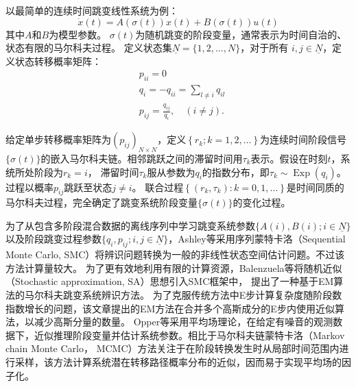 以最简单的连续时间跳变线性系统\cite{fang2002stabilization}为例：
\begin{equation}
    \dot{x}(t)=A(\sigma(t)) x(t)+B(\sigma(t)) u(t)
\end{equation}
其中$A$和$B$为模型参数。
$\sigma(t)$为随机跳变的阶段变量，通常表示为时间自治的、状态有限的马尔科夫过程。
定义状态集$\underline{N}=\{1,2, \ldots, N\}$，对于所有 $i, j \in \underline{N}$，定义状态转移概率矩阵：
\begin{equation}
    \begin{aligned}
    &p_{i i}=0\\
    &q_i=-q_{i i}=\sum_{l \neq i} q_{i l}\\
    &p_{i j}=\frac{q_{i j}}{q_i}, \quad(i \neq j) .
    \end{aligned}
\end{equation}

给定单步转移概率矩阵为$\left(p_{i j}\right)_{N \times N}$，定义$\left\{r_k ; k=1,2, \ldots\right\}$为连续时间阶段信号$\{\sigma(t)\}$的嵌入马尔科夫链。相邻跳跃之间的滞留时间用$\tau_k$表示。假设在时刻$t$，系统所处阶段为$r_k=i$，
滞留时间$\tau _k$服从参数为$q_i$的指数分布，即$\tau_k\sim \operatorname{Exp}(q_i)$。
过程以概率$p_{ij}$跳跃至状态$j\neq i$。
联合过程$\left\{\left(r_k, \tau_k\right): k=0,1, \ldots\right\}$是时间同质的马尔科夫过程，完全确定了跳变系统阶段变量$\{\sigma(t)\}$的变化过程。



为了从包含多阶段混合数据的离线序列中学习跳变系统参数$\{A(i), B(i); i \in \underline{N}\}$以及阶段跳变过程参数$\{q_i,p_{ij};i,j \in \underline{N}\}$，Ashley等采用序列蒙特卡洛（Sequential Monte Carlo, SMC）\cite{ashley2014sequential}将辨识问题转换为一般的非线性状态空间估计问题。不过该方法计算量较大。
为了更有效地利用有限的计算资源，Balenzuela等将随机近似（Stochastic approximation, SA）\cite{svensson2014identification,opper2007variational}思想引入SMC框架中，
提出了一种基于EM算法的马尔科夫跳变系统辨识方法\cite{balenzuela2022parameter}。
为了克服传统方法中E步计算复杂度随阶段数指数增长的问题，该文章提出的EM方法在合并多个高斯成分的E步内使用近似算法，以减少高斯分量的数量。
Opper等\cite{opper2007variational}采用平均场理论，在给定有噪音的观测数据下，近似推理阶段变量并估计系统参数。相比于马尔科夫链蒙特卡洛（Markov chain Monte Carlo， MCMC）方法关注于在阶段转换发生时从局部时间范围内进行采样，该方法计算系统潜在转移路径概率分布的近似，因而易于实现平均场的因子化。

